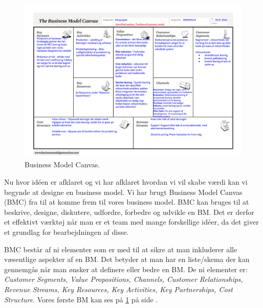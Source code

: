 \begin{figure}
  \includegraphics[angle=90, height=0.95\textheight]{graphics/BM.pdf}
  \caption{Business Model Canvas.}
  \label{bm}
\end{figure}

Nu hvor idéen er afklaret og vi har afklaret hvordan vi vil skabe værdi kan vi begynde at designe en business model.
Vi har brugt Business Model Canvas (BMC) fra \citet{osterwalder2009business} til at komme frem til vores business model.
BMC kan bruges til at beskrive, designe, diskutere, udfordre, forbedre og udvikle en BM.
Det er derfor et effektivt værktøj når man er et team med mange forskellige idéer, da det giver et grundlag for bearbejdningen af disse.


BMC består af ni elementer som er med til at sikre at man inkluderer alle væsentlige aspekter af en BM.
Det betyder at man har en liste/skema der kan gennemgås når man ønsker at definere eller bedre en BM.
De ni elementer er: \textit{Customer Segments, Value Propositions, Channels, Customer Relationships, Revenue Streams, Key Resources, Key Activities, Key Partnerships, Cost Structure}.
Vores første BM kan ses på \cref{bm} på side \pageref{bm}.
	